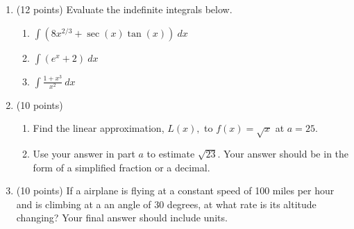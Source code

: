 \documentclass[12pt]{article}
\begin{document}
\newpage
\begin{enumerate}
\item (12 points) Evaluate the indefinite integrals below. 
	\begin{enumerate}
	\item $\displaystyle \int \left( 8x^{2/3} +\sec(x)\tan(x) \right) \: dx$
	\vfill
	\item $\displaystyle \int \left( e^x +2 \right) \: dx$
	\vfill
	\item $\displaystyle \int \frac{1+x^3}{x^2} \: dx$
	\vfill
	\end{enumerate}
	
\item (10 points)
\begin{enumerate}
\item Find the linear approximation, $L(x),$ to $f(x)=\sqrt{x}$ at $a=25.$
\vspace{1.5in}
\item Use your answer in part $a$ to estimate $\sqrt{23}.$ Your answer should be in the form of a simplified fraction or a decimal.
\vspace{1.5in}
\end{enumerate}

\newpage

\item (10 points) If a airplane is flying at a constant speed of 100 miles per hour and is climbing at a an angle of 30 degrees, at what rate is its altitude changing? Your final answer should include units.\\



\end{enumerate}
\end{document}
